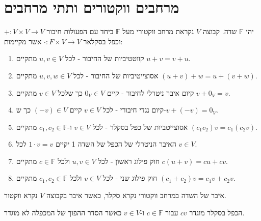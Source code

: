 \documentclass{tstextbook}
\begin{document}
\section{מרחבים ווקטורים ותתי מרחבים}

\begin{definition}
יהי \(\mathbb{F}\) שדה. קבוצה \(V\) נקראת מרחב ווקטורי מעל \(\mathbb{F}\) ביחד עם הפעולות חיבור \(+:V\times V\to V\) וכפל בסקלאר \(\cdot:F\times V\to V\) אשר מקיימות:

  \begin{enumerate}
    \item קווטטיביות  של החיבור - לכל \(u,v \in V\) מתקיים \(u+v=v+u\). 


    \item אסוצייטיביות של החיבור - לכל \(u,v,w \in V\) מתקיים \((u+v)+w=u+(v+w)\). 


    \item קיום איבר ניטרלי לחיבור -  קיים \(0_{V}\in V\) כך שלכל \(v \in V\) מתקיים \(v+0_{V}=v\). 


    \item קיום נגדי חיבורי - לכל \(v \in V\) קיים \((-v) \in V\) כך ש-\(v+(-v)=0_{V}\). 


    \item אסוצייטביות של כפל בסקלר - לכל \(v \in V\) ו-\(c_{1},c_{2} \in \mathbb{F}\) מתקיים \((c_{1}c_{2})v=c_{1}(c_{2}v)\). 


    \item האיבר הניטרלי של הכפל של השדה 1 יקיים \(1\cdot v=v\) לכל \(v \in V\). 


    \item חוק פילוג ראשון - לכל \(u,v \in V\) ולכל \(c \in \mathbb{F}\) מתקיים \(c(u+v)=cu+cv\). 


    \item חוק פילוג שני - לכל \(v \in V\) ולכל \(c_{1},c_{2} \in \mathbb{F}\) מתקיים \((c_{1}+c_{2})v=c_{1}v+c_{2}v\). 


  \end{enumerate}
\end{definition}
\begin{symbolize}
איבר של השדה במרחב ווקטורי נקרא סקלר, כאשר איבר בקבוצה \(V\) נקרא ווקטור.

\end{symbolize}
\begin{remark}
הכפל בסקלר מוגדר \(cv\) עבור \(c \in \mathbb{F}\) ו-\(v \in V\) כאשר הסדר ההפוך של המכפלה לא מוגדר.

\end{remark}
\end{document}

